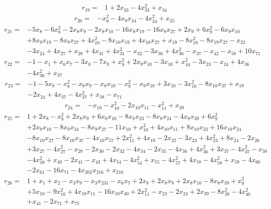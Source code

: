 \[\begin{aligned}
r_{19}={}&1+2x_{33}-4x_{33}^{2}+x_{34}
\end{aligned}\]
\[\begin{aligned}
r_{20}={}&-x_{9}^{2}-4x_{9}x_{34}-4x_{34}^{2}+x_{35}
\end{aligned}\]
\[\begin{aligned}
r_{21}={}&-5x_{8}-6x_{8}^{2}-2x_{8}x_{9}-2x_{8}x_{10}-16x_{8}x_{19}-16x_{8}x_{27}+2x_{9}+6x_{9}^{2}-6x_{9}x_{10}
\\ &+8x_{9}x_{19}-8x_{9}x_{27}+4x_{10}^{2}-8x_{10}x_{19}+4x_{10}x_{27}+x_{19}-8x_{19}^{2}-8x_{19}x_{27}-x_{23}
\\ &-3x_{24}+4x_{27}+x_{28}+4x_{31}+4x_{31}^{2}-x_{32}-3x_{36}+4x_{36}^{2}-x_{37}-x_{42}-x_{58}+10x_{71}
\end{aligned}\]
\[\begin{aligned}
r_{22}={}&-1-x_{1}+x_{6}x_{7}-3x_{8}-7x_{9}+x_{9}^{2}+2x_{9}x_{10}-3x_{10}+x_{10}^{2}-3x_{23}-x_{24}+4x_{36}
\\ &-4x_{36}^{2}+x_{37}
\end{aligned}\]
\[\begin{aligned}
r_{23}={}&-1-5x_{8}-x_{8}^{2}-x_{8}x_{9}-x_{8}x_{10}-x_{9}^{2}-x_{9}x_{10}+3x_{10}-3x_{10}^{2}-8x_{10}x_{37}+x_{19}
\\ &-2x_{24}+4x_{37}-4x_{37}^{2}+x_{38}-x_{71}
\end{aligned}\]
\[\begin{aligned}
r_{24}={}&-x_{10}-x_{10}^{2}-2x_{10}x_{11}-x_{11}^{2}+x_{39}
\end{aligned}\]
\[\begin{aligned}
r_{25}={}&1+2x_{8}-x_{8}^{2}+2x_{8}x_{9}+6x_{8}x_{10}-8x_{8}x_{23}-8x_{8}x_{24}-4x_{8}x_{39}+6x_{9}^{2}
\\ &+2x_{9}x_{10}-8x_{9}x_{24}-8x_{9}x_{27}-11x_{10}+x_{10}^{2}+4x_{10}x_{11}+8x_{10}x_{23}+16x_{10}x_{24}
\\ &-8x_{10}x_{27}-8x_{10}x_{37}-4x_{10}x_{57}+2x_{11}^{2}+4x_{19}-2x_{22}-3x_{23}+4x_{23}^{2}+8x_{24}-2x_{26}
\\ &+3x_{27}-4x_{27}^{2}-x_{28}-2x_{30}-2x_{32}-4x_{34}-2x_{35}-4x_{36}+4x_{36}^{2}+3x_{37}-4x_{37}^{2}-x_{38}
\\ &-4x_{39}^{2}+x_{40}-2x_{41}-x_{43}+4x_{54}-4x_{54}^{2}+x_{55}-4x_{57}^{2}+4x_{58}-4x_{58}^{2}+x_{59}-4x_{60}
\\ &-2x_{61}-16x_{71}-4x_{202}x_{216}+x_{210}
\end{aligned}\]
\[\begin{aligned}
r_{26}={}&1+x_{1}+x_{2}-x_{3}x_{9}-x_{3}x_{231}-x_{6}x_{7}+2x_{8}+2x_{8}x_{9}+2x_{8}x_{10}-8x_{8}x_{39}+x_{9}^{2}
\\ &+5x_{10}-9x_{10}^{2}+4x_{10}x_{11}-16x_{10}x_{40}+2x_{11}^{2}-x_{23}-2x_{24}+2x_{39}-8x_{39}^{2}-4x_{40}^{2}
\\ &+x_{41}-2x_{71}+x_{75}
\end{aligned}\]
